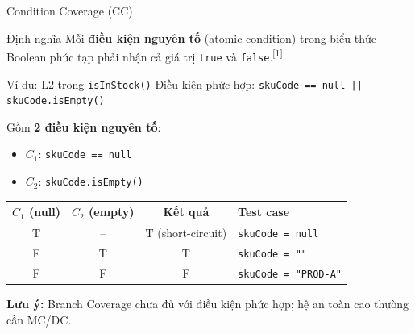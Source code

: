 \documentclass[aspectratio=169,12pt]{beamer}
\newcommand{\sref}[1]{\textsuperscript{\scriptsize[#1]}}
\begin{document}
\begin{frame}[shrink=22]{Condition Coverage (CC)}
  \begin{block}{Định nghĩa}
    Mỗi \textbf{điều kiện nguyên tố} (atomic condition) trong biểu thức
    Boolean phức tạp phải nhận cả giá trị \texttt{true} và \texttt{false}.\sref{1}
  \end{block}

  \vspace{0.1em}
  \begin{exampleblock}{Ví dụ: L2 trong \texttt{isInStock()}}
    Điều kiện phức hợp: \texttt{skuCode == null || skuCode.isEmpty()}

    Gồm \textbf{2 điều kiện nguyên tố}:
    \begin{itemize}
      \item $C_1$: \texttt{skuCode == null}
      \item $C_2$: \texttt{skuCode.isEmpty()}
    \end{itemize}

    \begin{center}
    \small
    \begin{tabular}{cccl}
      \toprule
      $C_1$ (null) & $C_2$ (empty) & \textbf{Kết quả} & \textbf{Test case} \\
      \midrule
      T & -- & T (short-circuit) & \texttt{skuCode = null} \\
      F & T  & T & \texttt{skuCode = ""} \\
      F & F  & F & \texttt{skuCode = "PROD-A"} \\
      \bottomrule
    \end{tabular}
    \end{center}
  \end{exampleblock}

  {\small\textbf{Lưu ý:} Branch Coverage chưa đủ với điều kiện phức hợp; hệ an toàn cao thường cần MC/DC.}
\end{frame}
\end{document}
